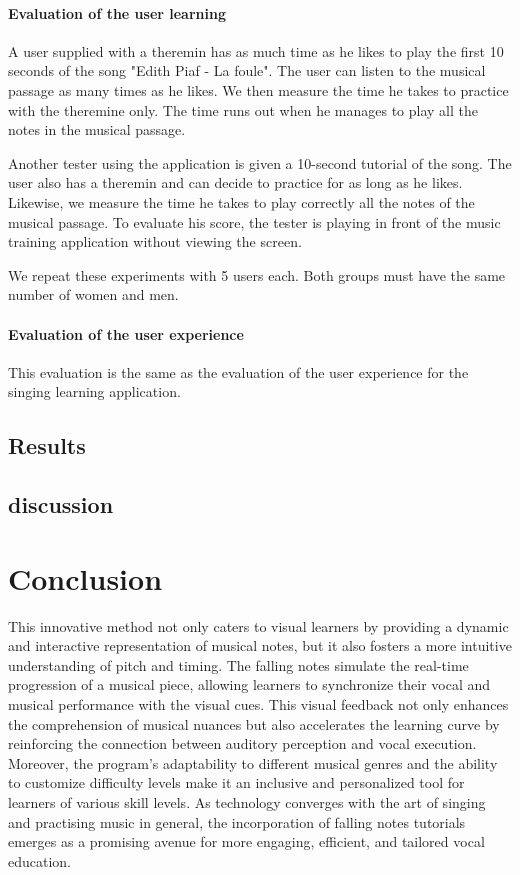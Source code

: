 \paragraph{Evaluation of the user learning}

A user supplied with a theremin has as much time as he likes to play the first 10 seconds of the song "Edith Piaf - La foule". The user can listen to the musical passage as many times as he likes. We then measure the time he takes to practice with the theremine only. The time runs out when he manages to play all the notes in the musical passage. 

Another tester using the application is given a 10-second tutorial of the song. The user also has a theremin and can decide to practice for as long as he likes. Likewise, we measure the time he takes to play correctly all the notes of the musical passage. To evaluate his score, the tester is playing in front of the music training application without viewing the screen.

We repeat these experiments with 5 users each. Both groups must have the same number of women and men.

\paragraph{Evaluation of the user experience}

This evaluation is the same as the evaluation of the user experience for the singing learning application.

\subsection{Results}

\subsection{discussion}

\section{Conclusion}

This innovative method not only caters to visual learners by providing a dynamic and interactive representation of musical notes, but it also fosters a more intuitive understanding of pitch and timing. The falling notes simulate the real-time progression of a musical piece, allowing learners to synchronize their vocal and musical performance with the visual cues. 
This visual feedback not only enhances the comprehension of musical nuances but also accelerates the learning curve by reinforcing the connection between auditory perception and vocal execution. Moreover, the program's adaptability to different musical genres and the ability to customize difficulty levels make it an inclusive and personalized tool for learners of various skill levels. As technology converges with the art of singing and practising music in general, the incorporation of falling notes tutorials emerges as a promising avenue for more engaging, efficient, and tailored vocal education.